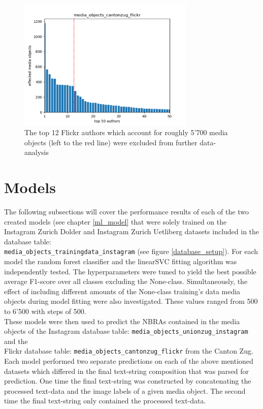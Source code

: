 \begin{figure}[h!]
   \centering
   \includegraphics[width=0.75\textwidth]{img/cantonzug_flickr_top50_w_line}
   \caption{The top 12 Flickr authors which account for roughly 5'700 media objects (left to the red line) were excluded from further data-analysis}
   \label{img:dominant_users_flickr}
\end{figure}

\section{Models} \label{results_models}
The following subsections will cover the  performance results of each of the two created models (see chapter \ref{ml_model} that were solely trained on the Instagram Zurich Dolder and Instagram Zurich Uetliberg datasets included in the database table:\\ \texttt{media\_objects\_trainingdata\_instagram} (see figure \ref{database_setup}). For each model the random forest classifier and the linearSVC fitting algorithm was independently tested. The hyperparameters were tuned to yield the best possible average F1-score over all classes excluding the None-class. Simultaneously, the effect of including different amounts of the None-class training's data media objects during model fitting were also investigated. These values ranged from 500 to 6'500 with steps of 500.\\
These models were then used to predict the NBRAs contained in the media objects of the Instagram database table: \texttt{media\_objects\_unionzug\_instagram} and the \\Flickr database table: \texttt{media\_objects\_cantonzug\_flickr} from the Canton Zug.\\
Each model performed two separate predictions on each of the above mentioned datasets which differed in the final text-string composition that was parsed for prediction. One time the final text-string was constructed by concatenating the processed text-data and the image labels of a given media object. The second time the final text-string only contained the processed text-data.

